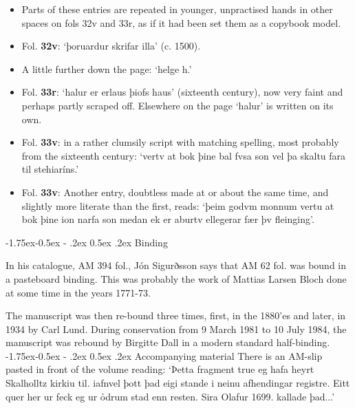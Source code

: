 \documentclass[11pt,twoside]{article}\makeatletter
\makeatletter
\def\ref{}
\renewcommand\subsection{\@startsection{subsection}{2}{\z@}%
     {-1.75ex\@plus -0.5ex \@minus- .2ex}%
     {0.5ex \@plus .2ex}%
     {\reset@font\Large\sffamily}}
\makeatother
\begin{document}
\begin{itemize}
\item Parts of these entries are repeated in younger, unpractised hands in other spaces on fols 32v and 33r, as if it had been set them as a copybook model.
\item Fol. \textbf{32v}:  ‘þoruardur skrifar illa’ (c. 1500).
\item A little further down the page: ‘helge h.’
\item Fol. \textbf{33r}:  ‘halur er erlaus þiofs haus’ (sixteenth century), now very faint and perhaps partly scraped off. Elsewhere on the page ‘halur’ is written on its own.
\item Fol. \textbf{33v}:  in a rather clumsily script with matching spelling, most probably from the sixteenth century: ‘vertv at bok þine {\hskip1pt}\newline  bal fvsa son vel þa skaltu {\hskip1pt}\newline  fara til stehiaríns.’
\item Fol. \textbf{33v}:  Another entry, doubtless made at or about the same time, and slightly more literate than the first, reads: ‘þeim godvm monnum vertu at bok þine ion narfa son medan ek {\hskip1pt}\newline  er aburtv ellegerar fær þv fleinging’.
\end{itemize} 
\subsection{Binding}
\par
In his catalogue, {\ref AM 394 fol.}, {\name Jón Sigurðsson} says that AM 62 fol. was bound in a pasteboard binding. This was probably the work of {\name Mattias Larsen Bloch} done at some time in the years 1771-73.\par
The manuscript was then re-bound three times, first, in the 1880'es and later, in 1934 by {\name Carl Lund}. During conservation from 9 March 1981 to 10 July 1984, the manuscript was rebound by {\name Birgitte Dall} in a modern standard half-binding.
\subsection{Accompanying material}
There is an AM-slip pasted in front of the volume reading: ‘Þetta fragment true eg hafa {\hskip1pt}\newline  heyrt Skalholltz kirkiu til. {\hskip1pt}\newline  iafnvel þott þad eigi stande {\hskip1pt}\newline  i neinu afhendingar registre. {\hskip1pt}\newline  Eitt quer her ur feck eg ur ỏd{\hskip1pt}\newline rum stad enn resten. {\hskip1pt}\newline  Sira Olafur 1699. kallade þad...’
\end{document}
